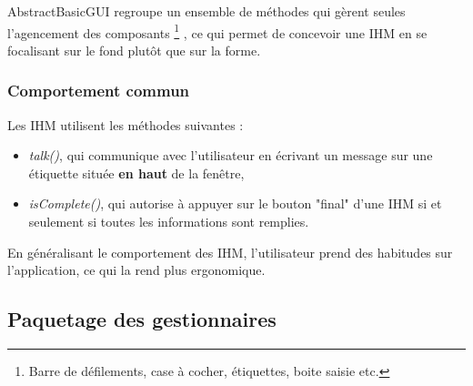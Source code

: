 AbstractBasicGUI regroupe un ensemble de méthodes qui gèrent seules l'agencement des composants
\footnote{\label{composants_ihm}Barre de défilements, case à cocher, étiquettes, boite saisie etc.}
, ce qui permet de concevoir une IHM en se focalisant sur le fond plutôt que sur la forme.

\subsubsection{Comportement commun}
Les IHM utilisent les méthodes suivantes :
\begin{itemize}
\item \textit{talk()}, qui communique avec l'utilisateur en écrivant un message sur une étiquette située \textbf{en haut} de la fenêtre,
\item \textit{isComplete()}, qui autorise à appuyer sur le bouton "final" d'une IHM si et seulement si toutes les informations sont remplies.
\end{itemize}

En généralisant le comportement des IHM, l'utilisateur prend des habitudes sur l'application, ce qui la rend plus ergonomique.

\subsection{Paquetage des gestionnaires}
